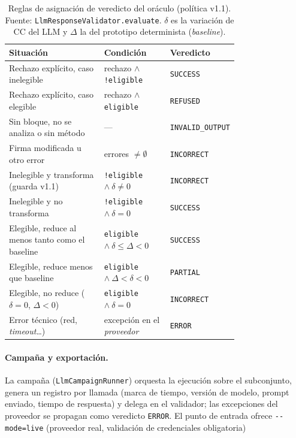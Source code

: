 \begin{table}[H]
\centering
\caption{Reglas de asignación de veredicto del oráculo (política v1.1).
Fuente: \texttt{LlmResponseValidator.evaluate}. $\delta$ es la variación de
CC del LLM y $\Delta$ la del prototipo determinista (\emph{baseline}).}
\label{tab:oraculo}
\begin{tabular}{@{}p{0.46\linewidth}p{0.30\linewidth}l@{}}
\toprule
\textbf{Situación} & \textbf{Condición} & \textbf{Veredicto} \\
\midrule
Rechazo explícito, caso inelegible & rechazo $\wedge$ \lstinline|!eligible| & \texttt{SUCCESS} \\
Rechazo explícito, caso elegible & rechazo $\wedge$ \lstinline|eligible| & \texttt{REFUSED} \\
Sin bloque, no se analiza o sin método & --- & \texttt{INVALID\_OUTPUT} \\
Firma modificada u otro error & errores $\neq \emptyset$ & \texttt{INCORRECT} \\
Inelegible y transforma (guarda v1.1) & \lstinline|!eligible| $\wedge\ \delta \neq 0$ & \texttt{INCORRECT} \\
Inelegible y no transforma & \lstinline|!eligible| $\wedge\ \delta = 0$ & \texttt{SUCCESS} \\
Elegible, reduce al menos tanto como el baseline & \lstinline|eligible| $\wedge\ \delta \le \Delta < 0$ & \texttt{SUCCESS} \\
Elegible, reduce menos que baseline & \lstinline|eligible| $\wedge\ \Delta < \delta < 0$ & \texttt{PARTIAL} \\
Elegible, no reduce ($\delta=0$, $\Delta<0$) & \lstinline|eligible| $\wedge\ \delta = 0$ & \texttt{INCORRECT} \\
Error técnico (red, \emph{timeout}\dots) & excepción en el \emph{proveedor} & \texttt{ERROR} \\
\bottomrule
\end{tabular}
\end{table}

\paragraph{Campaña y exportación.} La campaña (\texttt{LlmCampaignRunner})
orquesta la ejecución sobre el subconjunto, genera un registro por llamada
(marca de tiempo, versión de modelo, prompt enviado, tiempo de respuesta) y delega
en el validador; las excepciones del proveedor se propagan como
veredicto \texttt{ERROR}. El punto de
entrada ofrece \lstinline|--mode=live| (proveedor
real, validación de credenciales obligatoria)
